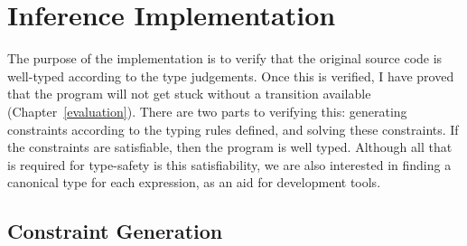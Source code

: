 \documentclass[12pt,a4paper,twoside,openright]{report}
\theoremstyle{definition}
\theoremstyle{dotless}
\begin{document}
\section{Inference Implementation}

The purpose of the implementation is to verify that the original source code is
well-typed according to the type judgements. Once this is verified, I have
proved that the program will not get stuck without a transition available (Chapter~\ref{evaluation}).
There are two parts to verifying this: generating constraints according to the
typing rules defined, and solving these constraints. If the constraints are
satisfiable, then the program is well typed. Although all that is required for
type-safety is this satisfiability, we are also interested in finding a
canonical type for each expression, as an aid for development tools.

\subsection{Constraint Generation}
\end{document}
